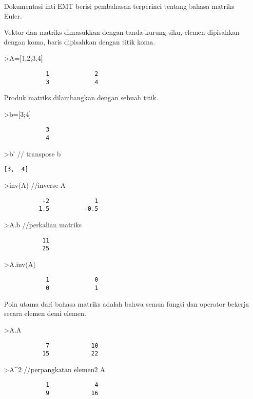 \documentclass[
]{book}
\begin{document}
Dokumentasi inti EMT berisi pembahasan terperinci tentang bahasa matriks Euler.

Vektor dan matriks dimasukkan dengan tanda kurung siku, elemen dipisahkan dengan koma, baris dipisahkan dengan titik koma.

\textgreater A={[}1,2;3,4{]}

\begin{verbatim}
            1             2 
            3             4 
\end{verbatim}

Produk matriks dilambangkan dengan sebuah titik.

\textgreater b={[}3;4{]}

\begin{verbatim}
            3 
            4 
\end{verbatim}

\textgreater b' // transpose b

\begin{verbatim}
[3,  4]
\end{verbatim}

\textgreater inv(A) //inverse A

\begin{verbatim}
           -2             1 
          1.5          -0.5 
\end{verbatim}

\textgreater A.b //perkalian matriks

\begin{verbatim}
           11 
           25 
\end{verbatim}

\textgreater A.inv(A)

\begin{verbatim}
            1             0 
            0             1 
\end{verbatim}

Poin utama dari bahasa matriks adalah bahwa semua fungsi dan operator bekerja secara elemen demi elemen.

\textgreater A.A

\begin{verbatim}
            7            10 
           15            22 
\end{verbatim}

\textgreater A\^{}2 //perpangkatan elemen2 A

\begin{verbatim}
            1             4 
            9            16 
\end{verbatim}
\end{document}
